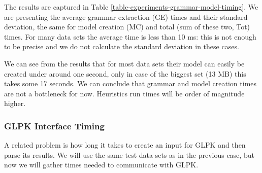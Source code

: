 The results are captured in Table \ref{table-experiments-grammar-model-timing}. We are presenting the average grammar extraction (GE) times and their standard deviation, the same for model creation (MC) and total (sum of these two, Tot) times. For many data sets the average time is less than 10 ms: this is not enough to be precise and we do not calculate the standard deviation in these cases.

We can see from the results that for most data sets their model can easily be created under around one second, only in case of the biggest set  (13 MB) this takes some 17 seconds. We can conclude that grammar and model creation times are not a bottleneck for now. Heuristics run times will be order of magnitude higher.

\subsubsection{GLPK Interface Timing}


A related problem is how long it takes to create an input for GLPK and then parse its results. We will use the same test data sets as in the previous case, but now we will gather times needed to communicate with GLPK.\\

